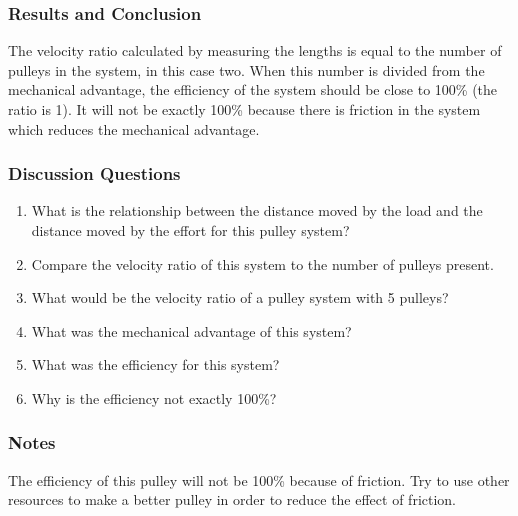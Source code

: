 \subsubsection*{Results and Conclusion}
The velocity ratio calculated by measuring the lengths is equal to the number of pulleys in the system, in this case two.  When this number is divided from the mechanical advantage, the efficiency of the system should be close to 100\% (the ratio is 1).  It will not be exactly 100\% because there is friction in the system which reduces the mechanical advantage.


\subsubsection*{Discussion Questions}
\begin{enumerate}
\item{What is the relationship between the distance moved by the load and the distance moved by the effort for this pulley system?}
\item{Compare the velocity ratio of this system to the number of pulleys present.}
\item{What would be the velocity ratio of a pulley system with 5 pulleys?}
\item{What was the mechanical advantage of this system?}
\item{What was the efficiency for this system?}
\item{Why is the efficiency not exactly 100\%?}
\end{enumerate}

\subsubsection*{Notes}
The efficiency of this pulley will not be 100\% because of friction.  Try to use other resources to make a better pulley in order to reduce the effect of friction.
